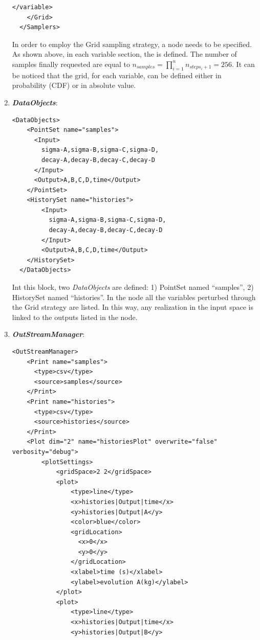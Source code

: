 \begin{enumerate}
\begin{lstlisting}[style=XML,morekeywords={arg,extension,pauseAtEnd,overwrite}]
      </variable>
    </Grid>
  </Samplers>  
\end{lstlisting}
  In order to employ the Grid sampling strategy, a 
   node needs to be specified. As shown above, in each variable section, the   is defined. 
  The number of samples finally requested are equal to $n_{samples} = \prod_{i=1}^{n} n_{steps_{i}+1} = 256$.
  It can be noticed that the grid, for each variable, can be defined either in probability (CDF) or in absolute value.  
   \item \textbf{\textit{DataObjects}}:
\begin{lstlisting}[style=XML,morekeywords={arg,extension,pauseAtEnd,overwrite}]
  <DataObjects>
    <PointSet name="samples">
      <Input>
        sigma-A,sigma-B,sigma-C,sigma-D,
        decay-A,decay-B,decay-C,decay-D
      </Input>
      <Output>A,B,C,D,time</Output>
    </PointSet>
    <HistorySet name="histories">
        <Input>
          sigma-A,sigma-B,sigma-C,sigma-D,
          decay-A,decay-B,decay-C,decay-D
        </Input>
        <Output>A,B,C,D,time</Output>
    </HistorySet>
  </DataObjects>
\end{lstlisting}
  Int this block, two \textit{DataObjects} are defined: 1) PointSet named 
  ``samples'', 2) HistorySet named ``histories''.
  In the  node all the variables 
  perturbed through the Grid strategy are listed. In this way, any
  realization in the input space is linked to the outputs listed in  the 
   node.
   \item \textbf{\textit{OutStreamManager}}:   
\begin{lstlisting}[style=XML,morekeywords={arg,extension,pauseAtEnd,overwrite}]
  <OutStreamManager>
    <Print name="samples">
      <type>csv</type>
      <source>samples</source>
    </Print>
    <Print name="histories">
      <type>csv</type>
      <source>histories</source>
    </Print>
    <Plot dim="2" name="historiesPlot" overwrite="false" verbosity="debug">
        <plotSettings>
            <gridSpace>2 2</gridSpace>
            <plot>
                <type>line</type>
                <x>histories|Output|time</x>
                <y>histories|Output|A</y>
                <color>blue</color>
                <gridLocation>
                  <x>0</x>
                  <y>0</y>
                </gridLocation>
                <xlabel>time (s)</xlabel>
                <ylabel>evolution A(kg)</ylabel>
            </plot>
            <plot>
                <type>line</type>
                <x>histories|Output|time</x>
                <y>histories|Output|B</y>

\end{lstlisting}
\end{enumerate}
